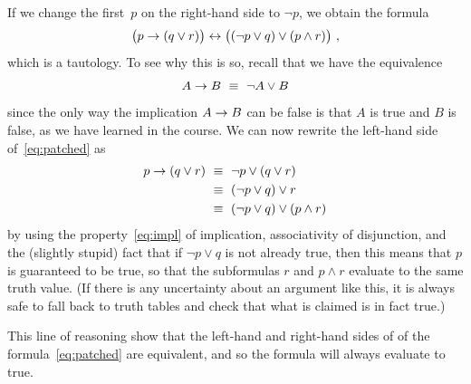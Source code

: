 \documentclass{jn-pset}
\begin{document}
\begin{problem}
\begin{solution}
  If we change the first~$p$ on the right-hand side to $\lnot p$,
  we obtain the formula
  \begin{equation}
    \label{eq:patched}
    \bigl(
    p \rightarrow (q \lor r)
    \bigr)
    \leftrightarrow
    \bigl(
    (\lnot p \lor q)
    \lor
    (p \land r)
    \bigr)
    \ ,
  \end{equation}    
  which is a tautology.
  To see why this is so, recall that
  we have the equivalence
  \begin{equation}
    \label{eq:impl}
    A \rightarrow B
    \ \equiv \
    \lnot A \lor B
  \end{equation}
  since the only way the implication
  $A \rightarrow B$
  can be false is that $A$ is true and $B$ is false,
  as we have learned in the course.
  We can now rewrite the left-hand side
  of~\eqref{eq:patched}
  as
  \begin{subequations}
  \begin{align}
    p \rightarrow (q \lor r )
    \ &\equiv \
        \lnot p \lor ( q \lor r ) 
    \\
    \ &\equiv \
        (\lnot p \lor  q ) \lor r 
    \\
    \ &\equiv \
        (\lnot p \lor  q ) \lor (p \land r) 
  \end{align}
  \end{subequations}
  by using
  the property~\eqref{eq:impl} of implication,
  associativity of disjunction,
  and the (slightly stupid) fact that if
  $\lnot p \lor  q $
  is not already true,
  then
  this means that $p$ is guaranteed to be true, so that
  the subformulas
  $r$
  and 
  $p \land r$ 
  evaluate to the same truth value.
  (If there is any uncertainty about an argument like this,
  it is always safe to fall back to truth tables and check
  that what is claimed is in fact true.)

  This line of reasoning show that the left-hand and right-hand sides of
  of the formula~\eqref{eq:patched} are equivalent,
  and so the formula will always evaluate to true.
\end{solution}

\end{problem}




\providecommand{\buildmaxheap}{\textsc{Build-Max-Heap}\xspace}
\providecommand{\maxheapify}{\textsc{Max-Heapify}\xspace}
\end{document}
